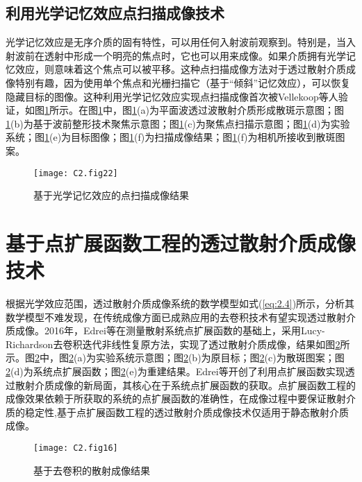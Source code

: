 \subsection{利用光学记忆效应点扫描成像技术}

光学记忆效应是无序介质的固有特性，可以用任何入射波前观察到。特别是，当入射波前在透射中形成一个明亮的焦点时，它也可以用来成像。如果介质拥有光学记忆效应，则意味着这个焦点可以被平移。这种点扫描成像方法对于透过散射介质成像特别有趣，因为使用单个焦点和光栅扫描它（基于“倾斜”记忆效应），可以恢复隐藏目标的图像。这种利用光学记忆效应实现点扫描成像首次被Vellekoop等人验证\cite{vellekoop_scattered_2010}，如图\ref{fig2:22}所示。在图\ref{fig2:22}中，图\ref{fig2:22}(a)为平面波透过波散射介质形成散斑示意图；图\ref{fig2:22}(b)为基于波前整形技术聚焦示意图；图\ref{fig2:22}(c)为聚焦点扫描示意图；图\ref{fig2:22}(d)为实验系统；图\ref{fig2:22}(e)为目标图像；图\ref{fig2:22}(f)为扫描成像结果；图\ref{fig2:22}(f)为相机所接收到散斑图案。

\begin{figure}[htp]
	\centering
	\texttt{[image: C2.fig22]}
	\caption{基于光学记忆效应的点扫描成像结果\cite{vellekoop_scattered_2010}}
	\label{fig2:22}
\end{figure}

\section{基于点扩展函数工程的透过散射介质成像技术}

根据光学效应范围，透过散射介质成像系统的数学模型如式(\ref{eq:2.4})所示，分析其数学模型不难发现，在传统成像方面已成熟应用的去卷积技术有望实现透过散射介质成像。2016年，Edrei等\cite{edrei_memory-effect_2016}在测量散射系统点扩展函数的基础上，采用Lucy-Richardson去卷积迭代非线性复原方法\cite{richardson_bayesian-based_1972,1974AJ_79_745L}，实现了透过散射介质成像，结果如图\ref{fig2:16}所示。图\ref{fig2:16}中，图\ref{fig2:16}(a)为实验系统示意图；图\ref{fig2:16}(b)为原目标；图\ref{fig2:16}(c)为散斑图案；图\ref{fig2:16}(d)为系统点扩展函数；图\ref{fig2:16}(e)为重建结果。Edrei等开创了利用点扩展函数实现透过散射介质成像的新局面，其核心在于系统点扩展函数的获取。点扩展函数工程的成像效果依赖于所获取的系统的点扩展函数的准确性，在成像过程中要保证散射介质的稳定性,基于点扩展函数工程的透过散射介质成像技术仅适用于静态散射介质成像。

\begin{figure}[htp]
	\centering
	\texttt{[image: C2.fig16]}
	\caption{基于去卷积的散射成像结果\cite{edrei_memory-effect_2016}}
	\label{fig2:16}
\end{figure}

